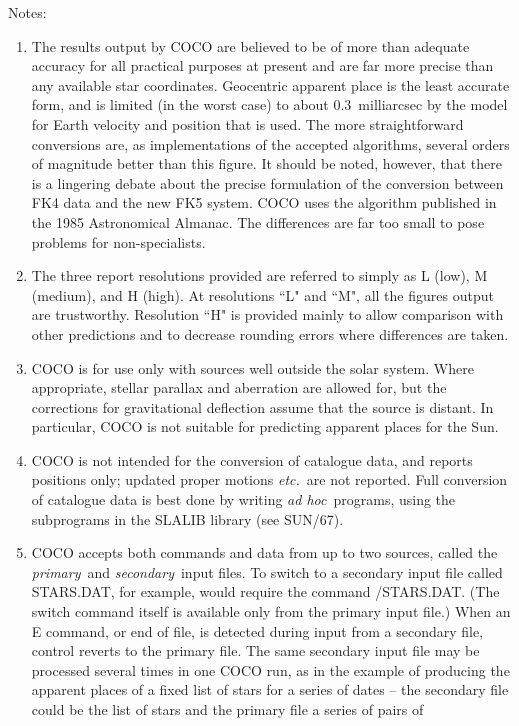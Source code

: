 Notes:
\begin{enumerate}
\item The results output by COCO are believed to be of more
than adequate accuracy for all practical purposes at
present and are far more precise than any
available star coordinates.
Geocentric apparent place
is the least accurate form,
and is limited (in the worst case) to about 0.3~milliarcsec
by the model for Earth velocity and position that is
used.
The more straightforward conversions are, as
implementations of the accepted algorithms, several
orders of magnitude better than this figure.
It should
be noted, however, that there is a lingering debate
about the precise formulation of the conversion between
FK4 data and the new FK5 system. COCO uses the algorithm
published in the 1985 Astronomical Almanac.
The differences are far too small to pose problems for non-specialists.
\item The three report resolutions provided are referred
to simply as L (low), M (medium),
and H (high).
At resolutions ``L" and ``M", all the
figures output are trustworthy.
Resolution ``H" is provided
mainly to allow comparison with other predictions and to
decrease rounding errors where differences are taken.
\item COCO is for use only with sources well outside the solar
system.
Where appropriate, stellar parallax and aberration
are allowed for, but the corrections for gravitational
deflection assume that the source is distant.
In particular, COCO is not suitable for predicting apparent places
for the Sun.
\item COCO is not intended for the conversion of catalogue data,
and reports positions only; updated proper motions {\it etc.}\
are not reported.
Full conversion of catalogue data is best done by writing
{\it ad hoc}\, programs, using the subprograms in the SLALIB
library (see SUN/67).
\item COCO accepts both commands and data from up to two
sources, called the {\it primary}\, and {\it secondary}\ input files.
To switch to a secondary input file called STARS.DAT, for
example, would require the command /STARS.DAT.
(The switch command itself is available only from the primary input file.)
When an E command, or end of file, is detected during input from
a secondary file, control reverts to the primary file.
The same secondary input file may be processed several times in
one COCO run, as in the example of producing the apparent places of
a fixed list of stars for a series of dates -- the secondary file
could be the list of stars and the primary file a series of pairs of

\end{enumerate}
